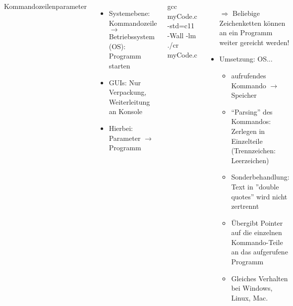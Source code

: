 \begin{frame}
%
\begin{columns}[T]
\begin{Large}
{Kommandozeilenparameter}
\vspace{6pt}
\end{Large}
%
\begin{itemize}
\item Systemebene: Kommandozeile $\rightarrow$ Betriebssystem (OS): Programm starten
\item GUIs: Nur Verpackung, Weiterleitung an Konsole
\item Hierbei: Parameter $\rightarrow$ Programm
\end{itemize}
%
\begin{cmdbox}
\footnotesize 
gcc myCode.c -std=c11 -Wall -lm\\
./cr myCode.c
\end{cmdbox}
%
%
\begin{itemize}
\item[$\Rightarrow$] Beliebige Zeichenketten können an ein Programm weiter gereicht werden!
\item Umsetzung: OS...
	\begin{itemize}
	\item aufrufendes Kommando $\rightarrow$ Speicher
	\item \enquote{Parsing} des Kommandos: Zerlegen in Einzelteile (Trennzeichen: Leerzeichen)
	\item Sonderbehandlung: Text in ''double quotes'' wird nicht zertrennt
	\item Übergibt Pointer auf die einzelnen Kommando-Teile an das aufgerufene Programm
	\item Gleiches Verhalten bei Windows, Linux, Mac.
	\end{itemize}
\end{itemize}
\end{columns}

%
\end{frame}


